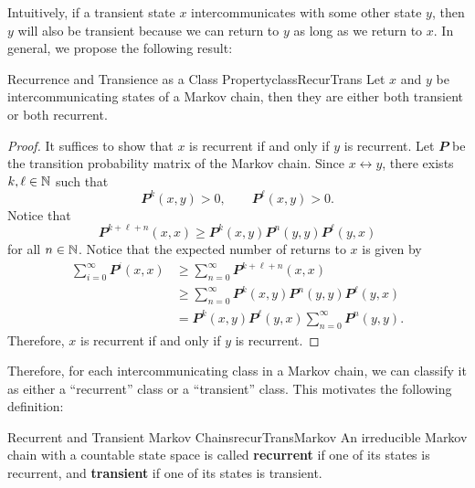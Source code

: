 \documentclass[math, code]{amznotes}
\theoremstyle{remark}
\begin{document}
Intuitively, if a transient state $x$ intercommunicates with some other state $y$, then $y$ will also be transient because we can return to $y$ as long as we return to $x$. In general, we propose the following result:
\begin{probox}{Recurrence and Transience as a Class Property}{classRecurTrans}
    Let $x$ and $y$ be intercommunicating states of a Markov chain, then they are either both transient or both recurrent.
    \tcblower
    \begin{proof}
        It suffices to show that $x$ is recurrent if and only if $y$ is recurrent. Let $\mathbfit{P}$ be the transition probability matrix of the Markov chain. Since $x \leftrightarrow y$, there exists $k, \ell \in \mathbb{N}$ such that
        \begin{equation*}
            \mathbfit{P}^k\left(x, y\right) > 0, \qquad \mathbfit{P}^{\ell}\left(x, y\right) > 0.
        \end{equation*}
        Notice that 
        \begin{equation*}
            \mathbfit{P}^{k + \ell + n}\left(x, x\right) \geq \mathbfit{P}^{k}\left(x, y\right)\mathbfit{P}^{n}\left(y, y\right)\mathbfit{P}^{\ell}\left(y, x\right)
        \end{equation*}
        for all $n \in \mathbb{N}$. Notice that the expected number of returns to $x$ is given by 
        \begin{align*}
            \sum_{i = 0}^{\infty}\mathbfit{P}^i\left(x, x\right) & \geq \sum_{n = 0}^{\infty}\mathbfit{P}^{k + \ell + n}\left(x, x\right) \\
            & \geq \sum_{n = 0}^{\infty}\mathbfit{P}^{k}\left(x, y\right)\mathbfit{P}^{n}\left(y, y\right)\mathbfit{P}^{\ell}\left(y, x\right) \\
            & = \mathbfit{P}^{k}\left(x, y\right)\mathbfit{P}^{\ell}\left(y, x\right)\sum_{n = 0}^{\infty}\mathbfit{P}^{n}\left(y, y\right).
        \end{align*}
        Therefore, $x$ is recurrent if and only if $y$ is recurrent.
    \end{proof}
\end{probox}
Therefore, for each intercommunicating class in a Markov chain, we can classify it as either a ``recurrent'' class or a ``transient'' class. This motivates the following definition:
\begin{dfnbox}{Recurrent and Transient Markov Chains}{recurTransMarkov}
    An irreducible Markov chain with a countable state space is called {\color{red} \textbf{recurrent}} if one of its states is recurrent, and {\color{red} \textbf{transient}} if one of its states is transient.
\end{dfnbox}
\end{document}
